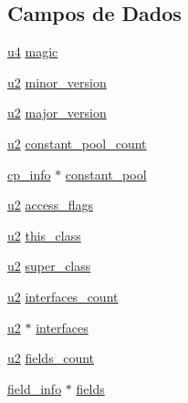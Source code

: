 \subsection*{Campos de Dados}
\begin{DoxyCompactItemize}
\item 
\hyperlink{_e___j_v_m_8h_aedf6ddc03df8caaaccbb4c60b9a9b850}{u4} \hyperlink{structarq_class_af2bde90f63d048e444c9437063394b4f}{magic}
\item 
\hyperlink{_e___j_v_m_8h_a5f223212eef04d10a4550ded680cb1cf}{u2} \hyperlink{structarq_class_a90b447e4eea035e1dd5fb45360a6a09f}{minor\+\_\+version}
\item 
\hyperlink{_e___j_v_m_8h_a5f223212eef04d10a4550ded680cb1cf}{u2} \hyperlink{structarq_class_a0aeda33023ba35d892279365630779d3}{major\+\_\+version}
\item 
\hyperlink{_e___j_v_m_8h_a5f223212eef04d10a4550ded680cb1cf}{u2} \hyperlink{structarq_class_a42ffae9572594b9a62b2e8af085a4b69}{constant\+\_\+pool\+\_\+count}
\item 
\hyperlink{_e___j_v_m_8h_aafdf80b0992e652420382fcf19b9d074}{cp\+\_\+info} $\ast$ \hyperlink{structarq_class_acf360846d7875335092462ec84c5d130}{constant\+\_\+pool}
\item 
\hyperlink{_e___j_v_m_8h_a5f223212eef04d10a4550ded680cb1cf}{u2} \hyperlink{structarq_class_a2d74614ed3f671871c0385e5233a8250}{access\+\_\+flags}
\item 
\hyperlink{_e___j_v_m_8h_a5f223212eef04d10a4550ded680cb1cf}{u2} \hyperlink{structarq_class_a0fa1b4b35fcc35e25fff7563f1ce7b2b}{this\+\_\+class}
\item 
\hyperlink{_e___j_v_m_8h_a5f223212eef04d10a4550ded680cb1cf}{u2} \hyperlink{structarq_class_a7bd81d496166908031c40895ed667ada}{super\+\_\+class}
\item 
\hyperlink{_e___j_v_m_8h_a5f223212eef04d10a4550ded680cb1cf}{u2} \hyperlink{structarq_class_a1e2038132261e59417016cd623005f56}{interfaces\+\_\+count}
\item 
\hyperlink{_e___j_v_m_8h_a5f223212eef04d10a4550ded680cb1cf}{u2} $\ast$ \hyperlink{structarq_class_ae20e5a978fd46334f0253968c13bf8ac}{interfaces}
\item 
\hyperlink{_e___j_v_m_8h_a5f223212eef04d10a4550ded680cb1cf}{u2} \hyperlink{structarq_class_ae453fb7f35aaaaf1beed2bcb0457ddb2}{fields\+\_\+count}
\item 
\hyperlink{_e___j_v_m_8h_a53c0da222997bf70321f1aebc84d8e02}{field\+\_\+info} $\ast$ \hyperlink{structarq_class_af9ed878ae2a6fe25020d83ce00f4407d}{fields}
\item 

\end{DoxyCompactItemize}
